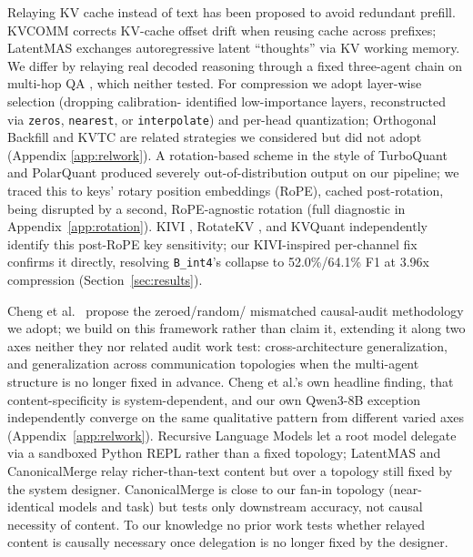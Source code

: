 \documentclass[11pt]{article}
\begin{document}
Relaying KV cache instead of text has been proposed to avoid redundant
prefill. KVCOMM \citep{kvcomm2025} corrects KV-cache offset drift when
reusing cache across prefixes; LatentMAS \citep{latentmas2026} exchanges
autoregressive latent ``thoughts'' via KV working memory. We differ by
relaying real decoded reasoning through a fixed three-agent chain on
multi-hop QA \citep{hotpotqa2018}, which neither tested. For
compression we adopt layer-wise selection (dropping calibration-
identified low-importance layers, reconstructed via \texttt{zeros},
\texttt{nearest}, or \texttt{interpolate}) and per-head quantization;
Orthogonal Backfill \citep{orthobackfill2026} and KVTC \citep{kvtc2026}
are related strategies we considered but did not adopt (Appendix
\ref{app:relwork}). A rotation-based scheme in the style of TurboQuant
\citep{turboquant2026} and PolarQuant \citep{polarquant2026} produced
severely out-of-distribution output on our pipeline; we traced this to
keys' rotary position embeddings (RoPE), cached post-rotation, being
disrupted by a second, RoPE-agnostic rotation (full diagnostic in
Appendix~\ref{app:rotation}). KIVI \citep{kivi2024}, RotateKV
\citep{rotatekv2025}, and KVQuant \citep{kvquant2024} independently
identify this post-RoPE key sensitivity; our KIVI-inspired per-channel
fix confirms it directly, resolving \texttt{B\_int4}'s collapse to
52.0\%/64.1\% F1 at 3.96x compression (Section~\ref{sec:results}).

Cheng et al.\ \citep{latentcommpay2026} propose the zeroed/random/
mismatched causal-audit methodology we adopt; we build on this
framework rather than claim it, extending it along two axes neither
they nor related audit work \citep{kvreusefails2026} test:
cross-architecture generalization, and generalization across
communication topologies when the multi-agent structure is no longer
fixed in advance. Cheng et al.'s own headline finding, that
content-specificity is system-dependent, and our own Qwen3-8B exception
independently converge on the same qualitative pattern from different
varied axes (Appendix~\ref{app:relwork}). Recursive Language Models
\citep{rlm2026} let a root model delegate via a sandboxed Python REPL
rather than a fixed topology; LatentMAS and CanonicalMerge
\citep{canonicalmerge2026} relay richer-than-text content but over a
topology still fixed by the system designer. CanonicalMerge is close to
our fan-in topology (near-identical models and task) but tests only
downstream accuracy, not causal necessity of content. To our knowledge
no prior work tests whether relayed content is causally necessary once
delegation is no longer fixed by the designer.
\end{document}
